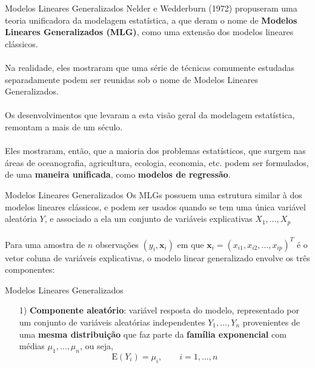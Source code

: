 \documentclass[10pt]{beamer}\usepackage[]{graphicx}\usepackage[]{color}
\newcommand{\mb}[1]{\mathbf{#1}}
\providecommand{\E}{\text{E}}
\theoremstyle{definition}
\begin{document}
\begin{frame}[fragile]{Modelos Lineares Generalizados}
  Nelder e Wedderburn (1972) propuseram uma teoria unificadora da
  modelagem estatística, a que deram o nome de \textbf{Modelos Lineares
    Generalizados (MLG)}, como uma extensão dos modelos lineares
  clássicos. \\~\\
  Na realidade, eles mostraram que uma série de técnicas comumente
  estudadas separadamente podem ser reunidas sob o nome de Modelos
  Lineares Generalizados. \\~\\
  Os desenvolvimentos que levaram a esta visão geral da modelagem
  estatística, remontam a mais de um século. \\~\\
  Eles mostraram, então, que a maioria dos problemas estatísticos, que
  surgem nas áreas de oceanografia, agricultura, ecologia, economia,
  etc. podem ser formulados, de uma \textbf{maneira unificada}, como
 \textbf{modelos de regressão}.
\end{frame}

\begin{frame}[fragile]{Modelos Lineares Generalizados}
  Os MLGs possuem uma estrutura similar à dos modelos lineares clássicos,
  e podem ser usados quando se tem uma única variável aleatória $Y$, e
  associado a ela um conjunto de variáveis explicativas $X_1, \ldots,
  X_p$ \\~\\
  Para uma amostra de $n$ observações $(y_i, \mb{x}_i)$ em que $\mb{x}_i =
  (x_{i1}, x_{i2}, \ldots, x_{ip})^{T}$ é o vetor coluna de variáveis
  explicativas, o modelo linear generalizado envolve os três
  componentes:
\end{frame}

\begin{frame}[fragile]{Modelos Lineares Generalizados}
\begin{enumerate}
  \item[1)] \textbf{Componente aleatório}: variável resposta do modelo,
    representado por um conjunto de variáveis aleatórias independentes
    $Y_1, \ldots, Y_n$ provenientes de uma \textbf{mesma distribuição}
    que faz parte da \textbf{família exponencial} com médias $\mu_1,
    \ldots, \mu_n$, ou seja,
    \begin{equation*}
      \E(Y_i) = \mu_i, \qquad i = 1, \ldots, n
    \end{equation*}
  \end{enumerate}
\end{frame}
\end{document}
